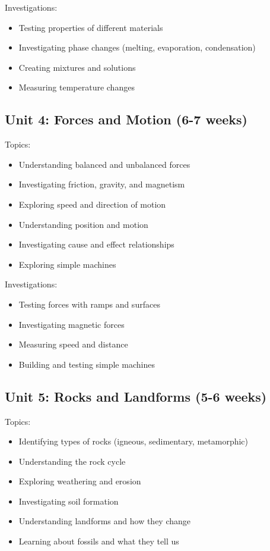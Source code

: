 \documentclass[11pt,letterpaper]{report}
\begin{document}
Investigations:
\begin{itemize}
\item Testing properties of different materials
\item Investigating phase changes (melting, evaporation, condensation)
\item Creating mixtures and solutions
\item Measuring temperature changes
\end{itemize}

\subsection{Unit 4: Forces and Motion (6-7 weeks)}

Topics:
\begin{itemize}
\item Understanding balanced and unbalanced forces
\item Investigating friction, gravity, and magnetism
\item Exploring speed and direction of motion
\item Understanding position and motion
\item Investigating cause and effect relationships
\item Exploring simple machines
\end{itemize}

Investigations:
\begin{itemize}
\item Testing forces with ramps and surfaces
\item Investigating magnetic forces
\item Measuring speed and distance
\item Building and testing simple machines
\end{itemize}

\subsection{Unit 5: Rocks and Landforms (5-6 weeks)}

Topics:
\begin{itemize}
\item Identifying types of rocks (igneous, sedimentary, metamorphic)
\item Understanding the rock cycle
\item Exploring weathering and erosion
\item Investigating soil formation
\item Understanding landforms and how they change
\item Learning about fossils and what they tell us
\end{itemize}
\end{document}
